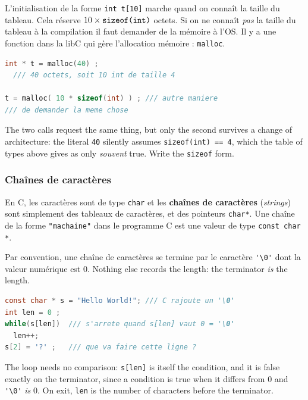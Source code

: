 L'initialisation de la forme \verb|int t[10]| marche quand on connaît la taille
du tableau. Cela réserve $10 \times \verb|sizeof(int)|$ octets. Si on ne
connaît \textit{pas} la taille du tableau à la compilation il faut demander de
la mémoire à l'OS. Il y a une fonction dans la libC qui gère l'allocation
mémoire : \verb|malloc|.

\begin{lstlisting}[language=C]
int * t = malloc(40) ;
  /// 40 octets, soit 10 int de taille 4

t = malloc( 10 * sizeof(int) ) ; /// autre maniere
/// de demander la meme chose
\end{lstlisting}

\begin{remark}
  The two calls request the same thing, but only the second survives a change
  of architecture: the literal \verb|40| silently assumes
  \verb|sizeof(int) == 4|, which the table of types above gives as only
  \textit{souvent} true. Write the \verb|sizeof| form.
\end{remark}

\subsubsection{Chaînes de caractères}
En C, les caractères sont de type \verb|char| et les \textbf{chaînes de
caractères} (\textit{strings}) sont simplement des tableaux de caractères, et
des pointeurs \verb|char*|. Une chaîne de la forme \verb|"machaine"| dans le
programme C est une valeur de type \verb|const char *|.

\begin{notation}
  Par convention, une chaîne de caractères se termine par le caractère
  \verb|'\0'| dont la valeur numérique est $0$. Nothing else records the
  length: the terminator \textit{is} the length.
\end{notation}

\begin{lstlisting}[language=C]
const char * s = "Hello World!"; /// C rajoute un '\0'
int len = 0 ;
while(s[len])  /// s'arrete quand s[len] vaut 0 = '\0'
  len++;
s[2] = '?' ;   /// que va faire cette ligne ?
\end{lstlisting}

\begin{remark}
  The loop needs no comparison: \verb|s[len]| is itself the condition, and it
  is false exactly on the terminator, since a condition is true when it differs
  from $0$ and \verb|'\0'| \textit{is} $0$. On exit, \verb|len| is the number of
  characters before the terminator.
\end{remark}

